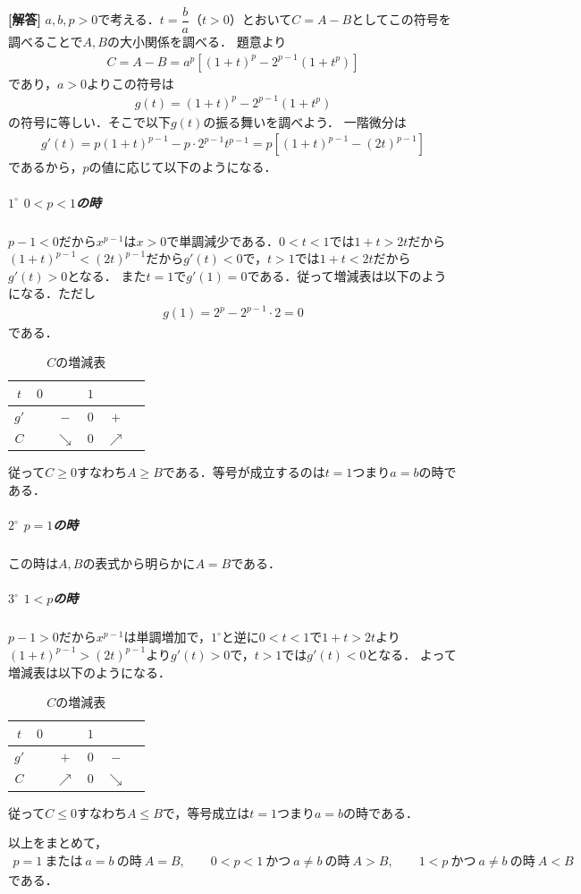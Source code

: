 \documentclass[../../main.tex]{subfiles}
\begin{document}
\begin{oframed}
  
\end{oframed}

{\bf [解答]}
$a,b,p>0$で考える．$t=\dfrac{b}{a}$（$t>0$）とおいて$C=A-B$としてこの符号を調べることで$A,B$の大小関係を調べる．
題意より
\begin{align}
  C=A-B=a^p\left[(1+t)^p-2^{p-1}(1+t^p)\right]
\end{align}
であり，$a>0$よりこの符号は
\begin{align}
  g(t)=(1+t)^p-2^{p-1}(1+t^p)
\end{align}
の符号に等しい．そこで以下$g(t)$の振る舞いを調べよう．
一階微分は
\begin{align}
  g'(t)=p(1+t)^{p-1}-p\cdot2^{p-1}t^{p-1}=p\left[(1+t)^{p-1}-(2t)^{p-1}\right]
\end{align}
であるから，$p$の値に応じて以下のようになる．

\subparagraph{$1^\circ$ $0<p<1$の時}

$p-1<0$だから$x^{p-1}$は$x>0$で単調減少である．$0<t<1$では$1+t>2t$だから$(1+t)^{p-1}<(2t)^{p-1}$だから$g'(t)<0$で，$t>1$では$1+t<2t$だから$g'(t)>0$となる．
また$t=1$で$g'(1)=0$である．従って増減表は以下のようになる．ただし
\begin{align}
  g(1)=2^p-2^{p-1}\cdot2=0
\end{align}
である．

\begin{table}[htb]
  \centering
  \caption{$C$の増減表}
  \begin{tabular}{c|ccccc}
    $t$ & $0$ & & $1$ & & \\
    \hline
    $g'$ & & $-$ & $0$ & $+$ & \\
    \hline
    $C$ & & $\searrow$ & $0$ & $\nearrow$ &
  \end{tabular}
\end{table}

従って$C \ge 0$すなわち$A \ge B$である．等号が成立するのは$t=1$つまり$a=b$の時である．

\subparagraph{$2^\circ$ $p=1$の時}

この時は$A,B$の表式から明らかに$A=B$である．

\subparagraph{$3^\circ$ $1<p$の時}

$p-1>0$だから$x^{p-1}$は単調増加で，$1^\circ$と逆に$0<t<1$で$1+t>2t$より$(1+t)^{p-1}>(2t)^{p-1}$より$g'(t)>0$で，$t>1$では$g'(t)<0$となる．
よって増減表は以下のようになる．

\begin{table}[htb]
  \centering
  \caption{$C$の増減表}
  \begin{tabular}{c|ccccc}
    $t$ & $0$ & & $1$ & & \\
    \hline
    $g'$ & & $+$ & $0$ & $-$ & \\
    \hline
    $C$ & & $\nearrow$ & $0$ & $\searrow$ &
  \end{tabular}
\end{table}

従って$C \le 0$すなわち$A\le B$で，等号成立は$t=1$つまり$a=b$の時である．
\casesend

以上をまとめて，
\begin{align}
  p=1\ \text{または}\ a=b\ \text{の時}\ A=B,\qquad
  0<p<1\ \text{かつ}\ a\ne b\ \text{の時}\ A>B,\qquad
  1<p\ \text{かつ}\ a\ne b\ \text{の時}\ A<B
\end{align}
である．

\newpage
\end{document}
